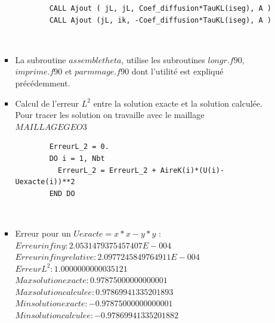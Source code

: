 \documentclass[11pt,a4paper]{scrartcl}%
\theoremstyle{plain}
\theoremstyle{definition}
\theoremstyle{remark}
\newenvironment{DDbox}[1]{
\begin{lrbox}{\BBbox}\begin{minipage}{\linewidth}}
{\end{minipage}\end{lrbox}\noindent\colorbox{Zgris}{\usebox{\BBbox}} \\
    [.5cm]}
\begin{document}
\begin{itemize}
\begin{itemize}
\begin{itemize}
\begin{DDbox}{\linewidth}
\begin{Verbatim}
        CALL Ajout ( jL, jL, Coef_diffusion*TauKL(iseg), A ) 
        CALL Ajout (jL, ik, -Coef_diffusion*TauKL(iseg), A )
		\end{Verbatim}
		\end{DDbox}
		\item La subroutine $assembletheta$, utilise les subroutines $longr.f90$, $imprime.f90$ et $parmmage.f90$ dont l'utilité est expliqué précédemment.
		\item Calcul de l'erreur $L^2$ entre la solution exacte et la solution calculée. Pour tracer les solution on travaille avec le maillage $MAILLAGEGEO3$\\
		\begin{DDbox}{\linewidth}
		\begin{Verbatim}
        ErreurL_2 = 0.
        DO i = 1, Nbt
          ErreurL_2 = ErreurL_2 + AireK(i)*(U(i)-Uexacte(i))**2
        END DO
		\end{Verbatim}
		\end{DDbox}
		\item Erreur pour un $Uexacte = x*x - y*y $ :\\
		
		$Erreur infiny  :    2.0531479375457407E-004$\\
		$Erreur infiny relative :    2.0977245849764911E-004$\\
		$Erreur L^2 :    1.0000000000035121     $\\
		$Max solution exacte :   0.97875000000000001     $\\
		$Max solution calculee :   0.97869941335201893   $ \\ 
		$Min solution exacte :  -0.97875000000000001    $ \\
		$Min solution calculee :  -0.97869941335201882 $
		

\end{itemize}
\end{itemize}
\end{itemize}
\end{document}
